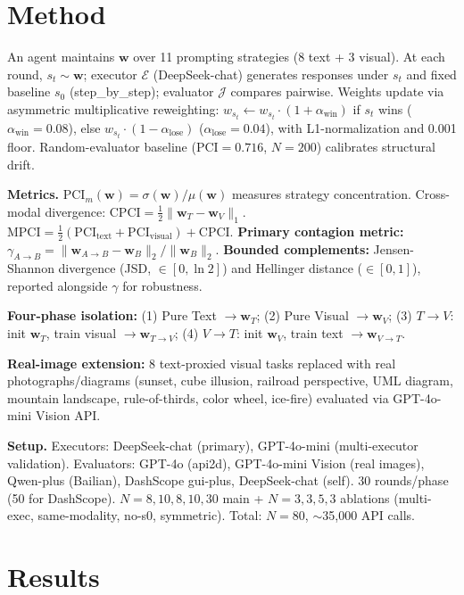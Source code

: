 \documentclass[letterpaper,10pt,twocolumn]{article}
\begin{document}
\section{Method}
\vspace{-4pt}
An agent maintains $\mathbf{w}$ over 11 prompting strategies (8 text + 3 visual). At each round, $s_t \sim \mathbf{w}$; executor $\mathcal{E}$ (DeepSeek-chat) generates responses under $s_t$ and fixed baseline $s_0$ (step\_by\_step); evaluator $\mathcal{J}$ compares pairwise. Weights update via asymmetric multiplicative reweighting: $w_{s_t} \leftarrow w_{s_t} \cdot (1+\alpha_{\text{win}})$ if $s_t$ wins ($\alpha_{\text{win}}{=}0.08$), else $w_{s_t} \cdot (1-\alpha_{\text{lose}})$ ($\alpha_{\text{lose}}{=}0.04$), with L1-normalization and 0.001 floor. Random-evaluator baseline (PCI${=}0.716$, $N{=}200$) calibrates structural drift.

\textbf{Metrics.} $\text{PCI}_m(\mathbf{w}) = \sigma(\mathbf{w})/\mu(\mathbf{w})$ measures strategy concentration. Cross-modal divergence: $\text{CPCI} = \frac{1}{2}\|\mathbf{w}_T - \mathbf{w}_V\|_1$. $\text{MPCI} = \frac{1}{2}(\text{PCI}_{\text{text}} + \text{PCI}_{\text{visual}}) + \text{CPCI}$.
\textbf{Primary contagion metric:} $\gamma_{A\to B} = \|\mathbf{w}_{A\to B} - \mathbf{w}_B\|_2 / \|\mathbf{w}_B\|_2$. \textbf{Bounded complements:} Jensen-Shannon divergence (JSD, $\in[0,\ln 2]$) and Hellinger distance ($\in[0,1]$), reported alongside $\gamma$ for robustness.

\textbf{Four-phase isolation:} (1) Pure Text $\rightarrow \mathbf{w}_T$; (2) Pure Visual $\rightarrow \mathbf{w}_V$; (3) $T{\to}V$: init $\mathbf{w}_T$, train visual $\rightarrow \mathbf{w}_{T\to V}$; (4) $V{\to}T$: init $\mathbf{w}_V$, train text $\rightarrow \mathbf{w}_{V\to T}$.

\textbf{Real-image extension:} 8 text-proxied visual tasks replaced with real photographs/diagrams (sunset, cube illusion, railroad perspective, UML diagram, mountain landscape, rule-of-thirds, color wheel, ice-fire) evaluated via GPT-4o-mini Vision API.

\textbf{Setup.} Executors: DeepSeek-chat (primary), GPT-4o-mini (multi-executor validation). Evaluators: GPT-4o (api2d), GPT-4o-mini Vision (real images), Qwen-plus (Bailian), DashScope gui-plus, DeepSeek-chat (self). 30 rounds/phase (50 for DashScope). $N{=}8,10,8,10,30$ main + $N{=}3,3,5,3$ ablations (multi-exec, same-modality, no-s0, symmetric). Total: $N{=}80$, $\sim$35,000 API calls.

\section{Results}
\vspace{-4pt}
\end{document}
